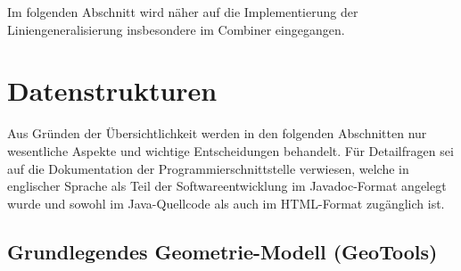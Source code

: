 \documentclass[../main/thesis.tex]{subfiles}
\begin{document}

Im folgenden Abschnitt wird näher auf die Implementierung der Liniengeneralisierung insbesondere im Combiner eingegangen.



\section{Datenstrukturen}
\label{ch:data-structures}


Aus Gründen der Übersichtlichkeit werden in den folgenden Abschnitten nur wesentliche Aspekte und wichtige Entscheidungen behandelt.
Für Detailfragen sei auf die Dokumentation der Programmierschnittstelle verwiesen, welche in englischer Sprache als Teil der Softwareentwicklung im Javadoc-Format angelegt wurde und sowohl im Java-Quellcode als auch im HTML-Format zugänglich ist.



\subsection{Grundlegendes Geometrie-Modell (GeoTools)}
\end{document}
